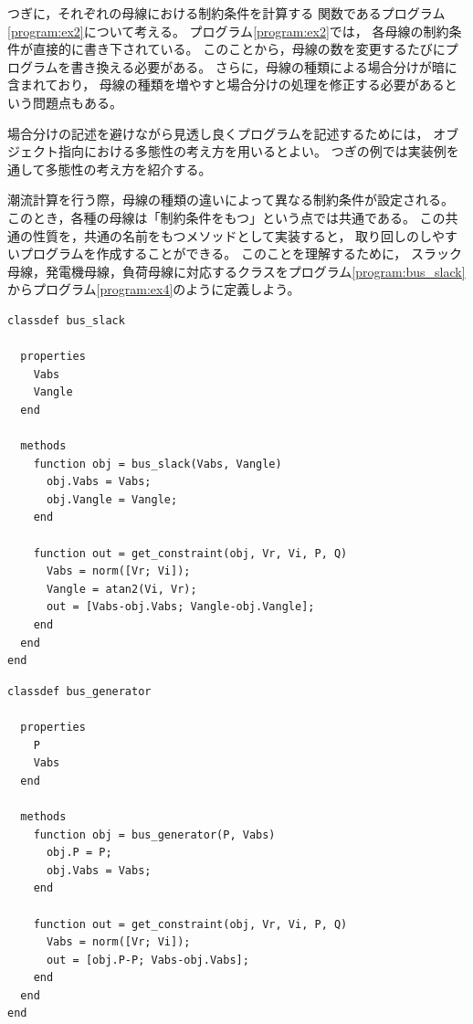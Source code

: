 \documentclass[tombow,dvipdfmx]{corona-a5-1.1}
\begin{document}
つぎに，それぞれの母線における制約条件を計算する
関数であるプログラム\nobreak\ref{program:ex2}について考える。
プログラム\nobreak\ref{program:ex2}では，
各母線の制約条件が直接的に書き下されている。
このことから，母線の数を変更するたびにプログラムを書き換える必要がある。
さらに，母線の種類による場合分けが暗に含まれており，
母線の種類を増やすと場合分けの処理を修正する必要があるという問題点もある。

場合分けの記述を避けながら見透し良くプログラムを記述するためには，
オブジェクト指向における多態性の考え方を用いるとよい。
つぎの例では実装例を通して多態性の考え方を紹介する。

\begin{例}[多態性を用いた潮流計算の実装例]
潮流計算を行う際，母線の種類の違いによって異なる制約条件が設定される。
このとき，各種の母線は「制約条件をもつ」という点では共通である。
この共通の性質を，共通の名前をもつメソッドとして実装すると，
取り回しのしやすいプログラムを作成することができる。
このことを理解するために，
スラック母線，発電機母線，負荷母線に対応するクラスをプログラム\nobreak\ref{program:bus_slack}からプログラム\nobreak\ref{program:ex4}のように定義しよう。
\smallskip
\begin{PROGRAMA}[count,title={bus\_slack.m}]\label{program:bus_slack}
\begin{verbatim}
classdef bus_slack
  
  properties
    Vabs
    Vangle
  end
  
  methods
    function obj = bus_slack(Vabs, Vangle)
      obj.Vabs = Vabs;
      obj.Vangle = Vangle;
    end
    
    function out = get_constraint(obj, Vr, Vi, P, Q)
      Vabs = norm([Vr; Vi]);
      Vangle = atan2(Vi, Vr);
      out = [Vabs-obj.Vabs; Vangle-obj.Vangle];
    end
  end
end
\end{verbatim}
\end{PROGRAMA}

\smallskip
\begin{PROGRAMA}[count,title={bus\_genertor.m}]\label{program:bus_PV}
\begin{verbatim}
classdef bus_generator
  
  properties
    P
    Vabs
  end
  
  methods
    function obj = bus_generator(P, Vabs)
      obj.P = P;
      obj.Vabs = Vabs;
    end
    
    function out = get_constraint(obj, Vr, Vi, P, Q)
      Vabs = norm([Vr; Vi]);
      out = [obj.P-P; Vabs-obj.Vabs];
    end
  end
end
\end{verbatim}
\end{PROGRAMA}


\end{例}
\end{document}
